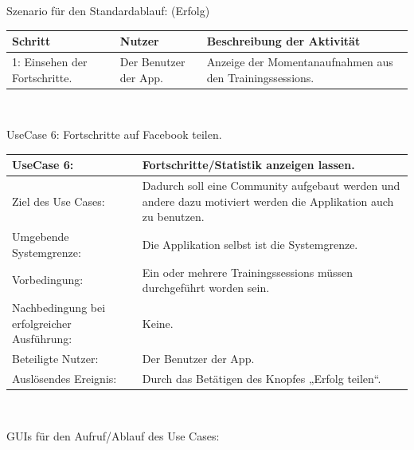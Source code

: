 \documentclass[FIPLY_base.tex]{subfiles}
\begin{document}
	\newpage
	Szenario für den Standardablauf: (Erfolg)
	\ \\
	\begin{center}	
		\def\arraystretch{1.3}%
		\begin{tabular}{| p{4cm} | p{4cm} | p{4cm} |}
			\hline
			\textbf{Schritt} & \textbf{Nutzer} & \textbf{Beschreibung der Aktivität}  \\ \hline 
			1: Einsehen der Fortschritte. & Der Benutzer der App. & Anzeige der Momentanaufnahmen aus den Trainingssessions.\\ \hline
		\end{tabular} \\
	\end{center}
	
	UseCase 6: Fortschritte auf Facebook teilen.
	\begin{center}
		\def\arraystretch{1.3}%
		\begin{tabular}{| p{5cm} | p{5cm} |}
			\hline
			UseCase 6: & Fortschritte/Statistik anzeigen lassen. \\ \hline 
			Ziel des Use Cases: & Dadurch soll eine Community aufgebaut werden und andere dazu motiviert werden die Applikation auch zu benutzen.  \\ \hline
			Umgebende Systemgrenze: & Die Applikation selbst ist die Systemgrenze. \\ \hline
			Vorbedingung: & Ein oder mehrere Trainingssessions müssen durchgeführt worden sein.  \\ \hline
			Nachbedingung bei erfolgreicher Ausführung: & Keine.  \\ \hline
			Beteiligte Nutzer: & Der Benutzer der App. \\ \hline
			Auslösendes Ereignis: & Durch das Betätigen des Knopfes „Erfolg teilen“. \\ \hline
		\end{tabular} \\
	\end{center}
	GUIs für den Aufruf/Ablauf des Use Cases:
\end{document}
